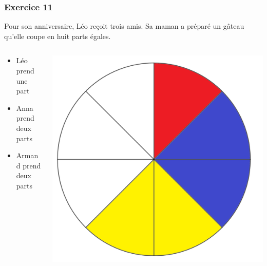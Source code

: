 \documentclass[xcolor={dvipsnames}]{beamer}
\begin{document}
\begin{frame}
	\frametitle{Exercice 11}
	
	Pour son anniversaire, Léo reçoit trois amis. Sa maman a préparé un gâteau qu'elle coupe en huit parts égales.
	
	
	\begin{columns}
		\begin{column}{0.5\textwidth}
			\begin{itemize}
				\item Léo prend une part
				\item Anna prend deux parts 
				\item Armand prend deux parts 
			\end{itemize}
		\end{column}
		\begin{column}{0.5\textwidth}
			\begin{center}
				\includegraphics[scale=0.08]{11_4}
			\end{center}
		\end{column}
	\end{columns}
	
\end{frame}
\end{document}
